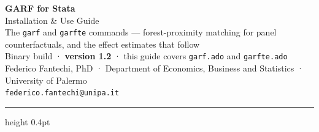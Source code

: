 \documentclass[11pt,a4paper]{article}
\begin{document}
\thispagestyle{empty}
\begin{center}
{\Huge\bfseries\color{ink} GARF for Stata}\\[0.4em]
{\Large\color{accent} Installation \& Use Guide}\\[1.0em]
{\large The \texttt{garf} and \texttt{garfte} commands — forest-proximity matching for panel counterfactuals, and the effect estimates that follow}\\[0.4em]
{\color{cmt}\small Binary build · \textbf{version 1.2} · this guide covers \texttt{garf.ado} and \texttt{garfte.ado}}\\[0.7em]
{\small Federico Fantechi, PhD · Department of Economics, Business and Statistics · University of Palermo}\\[0.15em]
{\small \texttt{federico.fantechi@unipa.it}}
\end{center}
\vspace{0.6em}
\hrule height 0.4pt
\vspace{0.4em}
\end{document}
